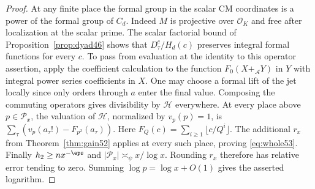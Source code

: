 \documentclass[a4paper,11pt]{article}
\theoremstyle{definition}
\theoremstyle{remark}
\numberwithin{equation}{section}
\begin{document}
\begin{proof}
At any finite place the formal group in the scalar CM coordinates
is a power of the formal group of \(C_d\). Indeed \(M\) is projective
over \(\mathcal O_K\) and free after localization at the scalar prime.
The scalar factorial bound of Proposition~\ref{prop:dyad46} shows
that \(D_\tau^c/H_d(c)\) preserves integral formal functions for
every \(c\). To pass from evaluation at the identity to this
operator assertion, apply the coefficient calculation to the
function \(F_0(X+_{\mathcal A}Y)\) in \(Y\) with integral power
series coefficients in \(X\). One may choose a formal lift of the
jet locally since only orders through \(a\) enter the final value.
Composing the commuting operators gives divisibility by
\(\mathcal H\) everywhere. At every place above \(p\in\mathcal P_x\),
the valuation of \(\mathcal H\), normalized by \(v_p(p)=1\), is
\(\sum_\tau(v_p(a_\tau!)-F_{p^2}(a_\tau))\). Here
\(F_Q(c)=\sum_{i\ge1}\lfloor c/Q^i\rfloor\). The additional
\(r_x\) from Theorem~\ref{thm:gain52} applies at every such place, proving
\eqref{eq:whole53}. Finally \(h_2\ge nx^{-\eps}\) and
\(|\mathcal P_x|\asymp_\psi x/\log x\). Rounding \(r_x\) therefore
has relative error tending to zero. Summing \(\log p=\log x+O(1)\)
gives the asserted logarithm.
\end{proof}
\end{document}
